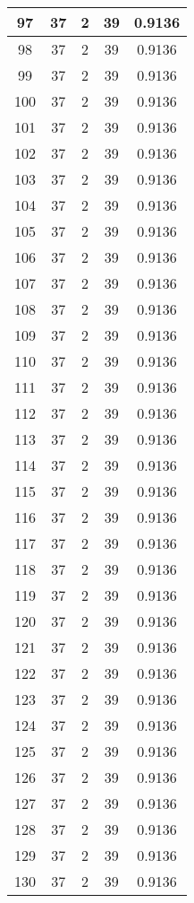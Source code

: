 \documentclass[letterpaper, 12pt]{article}
\begin{document}
\begin{longtable}{|c|c|c|c|c|}
\hline
97 & 37 & 2 & 39 & 0.9136 \\
\hline
98 & 37 & 2 & 39 & 0.9136 \\
\hline
99 & 37 & 2 & 39 & 0.9136 \\
\hline
100 & 37 & 2 & 39 & 0.9136 \\
\hline
101 & 37 & 2 & 39 & 0.9136 \\
\hline
102 & 37 & 2 & 39 & 0.9136 \\
\hline
103 & 37 & 2 & 39 & 0.9136 \\
\hline
104 & 37 & 2 & 39 & 0.9136 \\
\hline
105 & 37 & 2 & 39 & 0.9136 \\
\hline
106 & 37 & 2 & 39 & 0.9136 \\
\hline
107 & 37 & 2 & 39 & 0.9136 \\
\hline
108 & 37 & 2 & 39 & 0.9136 \\
\hline
109 & 37 & 2 & 39 & 0.9136 \\
\hline
110 & 37 & 2 & 39 & 0.9136 \\
\hline
111 & 37 & 2 & 39 & 0.9136 \\
\hline
112 & 37 & 2 & 39 & 0.9136 \\
\hline
113 & 37 & 2 & 39 & 0.9136 \\
\hline
114 & 37 & 2 & 39 & 0.9136 \\
\hline
115 & 37 & 2 & 39 & 0.9136 \\
\hline
116 & 37 & 2 & 39 & 0.9136 \\
\hline
117 & 37 & 2 & 39 & 0.9136 \\
\hline
118 & 37 & 2 & 39 & 0.9136 \\
\hline
119 & 37 & 2 & 39 & 0.9136 \\
\hline
120 & 37 & 2 & 39 & 0.9136 \\
\hline
121 & 37 & 2 & 39 & 0.9136 \\
\hline
122 & 37 & 2 & 39 & 0.9136 \\
\hline
123 & 37 & 2 & 39 & 0.9136 \\
\hline
124 & 37 & 2 & 39 & 0.9136 \\
\hline
125 & 37 & 2 & 39 & 0.9136 \\
\hline
126 & 37 & 2 & 39 & 0.9136 \\
\hline
127 & 37 & 2 & 39 & 0.9136 \\
\hline
128 & 37 & 2 & 39 & 0.9136 \\
\hline
129 & 37 & 2 & 39 & 0.9136 \\
\hline
130 & 37 & 2 & 39 & 0.9136 \\

\end{longtable}
\end{document}
